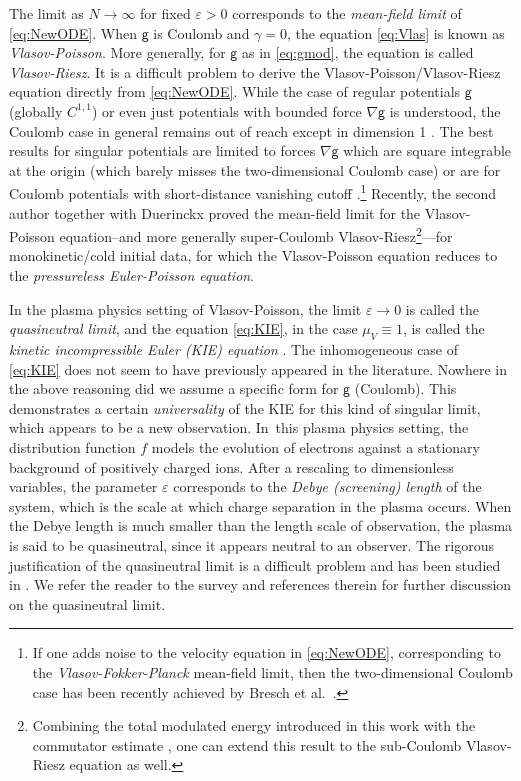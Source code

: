 \documentclass[10pt]{amsart}
\theoremstyle{plain}
\theoremstyle{definition}
\let\ga\gamma
\let\vep\varepsilon
\newcommand{\g}{{\mathsf{g}}}
\begin{document}
The limit as $N\to\infty$ for fixed $\vep>0$ corresponds to the \emph{mean-field limit} of \eqref{eq:NewODE}. When $\g$ is Coulomb and $\ga=0$, the equation \eqref{eq:Vlas} is known as \emph{Vlasov-Poisson}. More generally, for $\g$ as in \eqref{eq:gmod}, the equation is called \emph{Vlasov-Riesz}. It is a difficult problem to derive the Vlasov-Poisson/Vlasov-Riesz equation directly from \eqref{eq:NewODE}. While the case of regular potentials $\g$ (\eg globally $C^{1,1}$) \cite{NW1974, BH1977, Dobrushin1979, Duerinckx2021gl} or even just potentials with bounded force $\nabla\g$ \cite{JW2016} is understood, the Coulomb case in general remains out of reach except in dimension 1 \cite{Trocheris1986,Hauray2014}. The best results for singular potentials are limited to forces $\nabla\g$ which are square integrable at the origin \cite{HJ2007, HJ2015, BDJ2024} (which barely misses the two-dimensional Coulomb case) or are for Coulomb potentials with short-distance vanishing cutoff \cite{BP2016, Lazarovici2016, LP2017, Grass2021}.\footnote{If one adds noise to the velocity equation in \eqref{eq:NewODE}, corresponding to the \emph{Vlasov-Fokker-Planck} mean-field limit, then the two-dimensional Coulomb case has been recently achieved by Bresch et al.\ \cite{BJS2022}.} Recently, the second author together with Duerinckx \cite[App.]{Serfaty2020} proved the mean-field limit for the Vlasov-Poisson equation--and more generally super-Coulomb Vlasov-Riesz\footnote{Combining the total modulated energy introduced in this work with the commutator estimate \cite[Prop.\,4.1]{NRS2021}, one can extend this result to the sub-Coulomb Vlasov-Riesz equation as well.}---for monokinetic/cold initial data, for which the Vlasov-Poisson equation reduces to the \emph{pressureless Euler-Poisson equation}.

In the plasma physics setting of Vlasov-Poisson, the limit $\vep\to 0$ is called the \emph{quasineutral limit}, and the equation \eqref{eq:KIE}, in the case $\mu_V\equiv 1$, is called the \emph{kinetic incompressible Euler (KIE) equation} \cite{Brenier1989}. The inhomogeneous case of \eqref{eq:KIE} does not seem to have previously appeared in the literature. Nowhere in the above reasoning did we assume a specific form for $\g$ (\eg Coulomb). This demonstrates a certain \emph{universality} of the KIE for this kind of singular limit, which appears to be a new observation. In~this plasma physics setting, the distribution function $f$ models the evolution of electrons against a stationary background of positively charged ions. After a rescaling to dimensionless variables, the parameter $\vep$ corresponds to the \emph{Debye (screening) length} of the system, which is the scale at which charge separation in the plasma occurs. When the Debye length is much smaller than the length scale of observation, the plasma is said to be quasineutral, since it appears neutral to an observer. The rigorous justification of the quasineutral limit is a difficult problem and has been studied in \cite{BG1994, Grenier1995, Grenier1996,Grenier1999,Brenier2000,Masmoudi2001, HkH2015, HkR2016, HkI2017, HkI2017jde, GpI2018, GpI2020sing}. We refer the reader to the survey \cite{GpI2020qn} and references therein for further discussion on the quasineutral limit.
\end{document}
